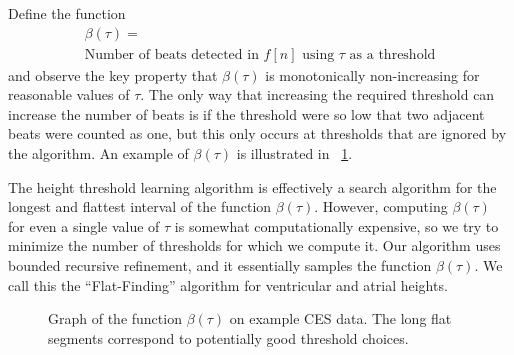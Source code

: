 \documentclass[conference]{IEEEtran}
\begin{document}
Define the function 
\begin{multline*}
	\beta(\tau) = \\\text{Number of beats detected in } f[n] \text{ using } \tau \text{ as a threshold}
\end{multline*}
and observe the key property that $\beta(\tau)$ is monotonically non-increasing for reasonable values of $\tau$. 
The only way that increasing the required threshold can increase the number of beats is if the threshold were so low that two adjacent beats were counted as one, but this only occurs at thresholds that are ignored by the algorithm.
An example of $\beta(\tau)$ is illustrated in \figurename~\ref{fig:beats}.

The height threshold learning algorithm is effectively a search algorithm for the longest and flattest
interval of the function $\beta(\tau)$.
However, computing $\beta(\tau)$ for even a single value of $\tau$ 
is somewhat computationally expensive,
so we try to minimize the number of thresholds for which we compute it.
Our algorithm uses bounded recursive refinement, and it essentially samples the function $\beta(\tau)$.
We call this the ``Flat-Finding'' algorithm for
ventricular and atrial heights.


\begin{figure}
	\centering
	\caption{Graph of the function $\beta(\tau)$ on example CES data. The long flat segments correspond to potentially good threshold choices.}
	\label{fig:beats}
\end{figure}
\end{document}
